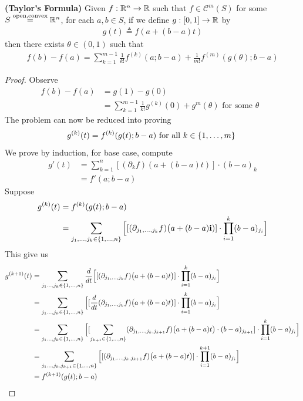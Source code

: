 \documentclass{report}
\begin{document}
\begin{theorem}
\textbf{(Taylor's Formula)} Given $f:\mathbb{R}^n\rightarrow \mathbb{R}$ such that $f \in \mathcal{C}^m(S)$ for some $S\overset{\text{open,convex}}{=}\mathbb{R}^n$, for each $a,b \in S$, if we define $g:[0,1]\rightarrow \mathbb{R}$ by 
\begin{align*}
g(t)\triangleq f(a+ (b-a)t)
\end{align*}
then there exists $\theta \in (0,1)$ such that 
\begin{align*}
f(b)-f(a) = \sum_{k=1}^{m-1} \frac{1}{k!}f^{(k)}(a;b-a)+ \frac{1}{m!}f^{(m)}(g(\theta); b-a)
\end{align*}
\end{theorem}
\begin{proof}
Observe 
\begin{align*}
f(b)-f(a)&=g(1)-g(0)\\
&=\sum_{k=1}^{m-1} \frac{1}{k!} g^{(k)}(0)+g^{m}(\theta)\text{ for some $\theta$ }
\end{align*}
The problem can now be reduced into proving 
\begin{align*}
g^{(k)}(t)=f^{(k)}(g(t);b-a)\text{ for all $k \in \{ 1,\dots ,m \}$ }
\end{align*}
We prove by induction, for base case, compute 
\begin{align*}
  g'(t)&=  \sum_{k=1}^n [(\partial_k f)(a+(b-a)t)] \cdot (b-a)_k  \\
  &= f'(a;b-a)
\end{align*}
Suppose 
\begin{align*}
g^{(k)}(t)&=f^{(k)}(g(t);b-a)\\
&=\sum_{j_1,\dots ,j_k \in \{ 1,\dots ,n \}} \Big[[(\partial_{j_1,\dots , j_k}f)\big(a+(b-a)\textbf{i})]\cdot \prod_{i=1}^k (b-a)_{j_i}   \Big]
\end{align*}
This give us 
\begin{align*}
g^{(k+1)}(t)&= \sum_{j_1\dots ,j_k \in \{ 1,\dots , n \}} \frac{d}{dt} \Big[[(\partial_{j_1,\dots , j_k}f)\big(a+(b-a)t\big)]\cdot \prod_{i=1}^k (b-a)_{j_i}    \Big]\\
&= \sum_{j_1\dots ,j_k \in \{ 1,\dots , n \}} \Big[[\frac{d}{dt} (\partial_{j_1,\dots , j_k}f)\big(a+(b-a)t \big)]\cdot \prod_{i=1}^k (b-a)_{j_i}    \Big]\\
&=\sum_{j_1\dots ,j_k \in \{ 1,\dots , n \}} \Big[[ \sum_{j_{k+1} \in \{ 1,\dots ,n \}} (\partial_{j_1,\dots , j_k,j_{k+1}}f)\big(a+(b-a)t \big)\cdot (b-a)_{j_{k+1}}]\cdot  \prod_{i=1}^k (b-a)_{j_i}    \Big]\\
&=\sum_{j_1\dots ,j_k ,j_{k+1} \in \{ 1,\dots , n \}} \Big[[ (\partial_{j_1,\dots , j_k,j_{k+1}}f)\big(a+(b-a)t \big)]\cdot \prod_{i=1}^{k+1} (b-a)_{j_i}    \Big]\\
&=f^{(k+1)}(g(t);b-a)
\end{align*}
\end{proof}
\end{document}
